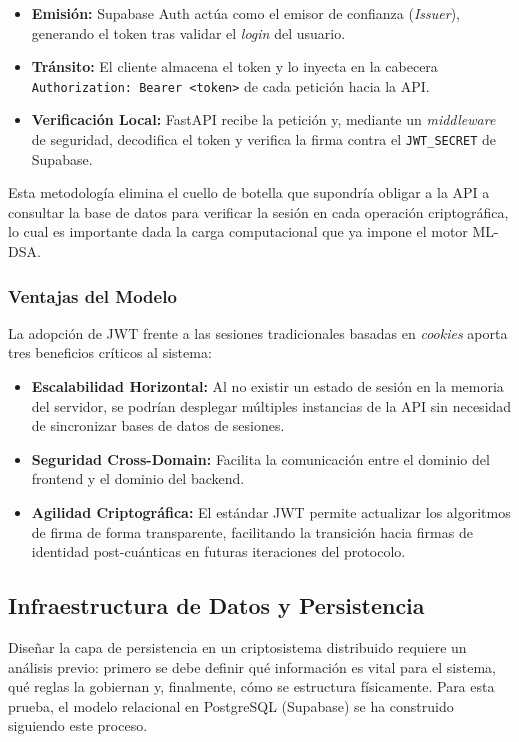 \documentclass[11pt, a4paper]{report}
\theoremstyle{definition}
\begin{document}
\begin{itemize}
    \item \textbf{Emisión:} Supabase Auth actúa como el emisor de confianza (\textit{Issuer}), generando el token tras validar el \textit{login} del usuario.
    \item \textbf{Tránsito:} El cliente almacena el token y lo inyecta en la cabecera \texttt{Authorization: Bearer <token>} de cada petición hacia la API.
    \item \textbf{Verificación Local:} FastAPI recibe la petición y, mediante un \textit{middleware} de seguridad, decodifica el token y verifica la firma contra el \texttt{JWT\_SECRET} de Supabase.
\end{itemize}

Esta metodología elimina el cuello de botella que supondría obligar a la API a consultar la base de datos para verificar la sesión en cada operación criptográfica, lo cual es importante dada la carga computacional que ya impone el motor ML-DSA.

\subsubsection{Ventajas del Modelo}

La adopción de JWT frente a las sesiones tradicionales basadas en \textit{cookies} aporta tres beneficios críticos al sistema:
\begin{itemize}
    \item \textbf{Escalabilidad Horizontal:} Al no existir un estado de sesión en la memoria del servidor, se podrían desplegar múltiples instancias de la API sin necesidad de sincronizar bases de datos de sesiones.
    \item \textbf{Seguridad Cross-Domain:} Facilita la comunicación entre el dominio del frontend y el dominio del backend.
    \item \textbf{Agilidad Criptográfica:} El estándar JWT permite actualizar los algoritmos de firma de forma transparente, facilitando la transición hacia firmas de identidad post-cuánticas en futuras iteraciones del protocolo.
\end{itemize}


\subsection{Infraestructura de Datos y Persistencia}
\label{subsec:infraestructura_datos}

Diseñar la capa de persistencia en un criptosistema distribuido requiere un análisis previo: primero se debe definir qué información es vital para el sistema, qué reglas la gobiernan y, finalmente, cómo se estructura físicamente. Para esta prueba, el modelo relacional en PostgreSQL (Supabase) se ha construido siguiendo este proceso.
\end{document}
